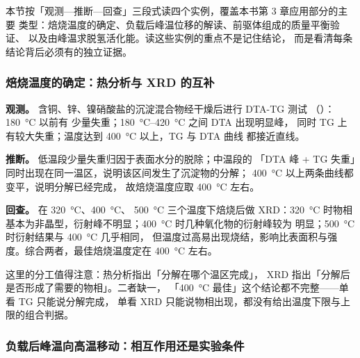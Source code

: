 \begin{probout}
本节按「观测—推断—回查」三段式读四个实例，覆盖本书第 3 章应用部分的主要
类型：焙烧温度的确定、负载后峰温位移的解读、前驱体组成的质量平衡验证、
以及由峰温求脱氢活化能。读这些实例的重点不是记住结论，
而是看清每条结论背后必须有的独立证据。
\end{probout}

\subsubsection{焙烧温度的确定：热分析与 XRD 的互补}

\begin{dataflow}
\textbf{观测。} 含铜、锌、镍硝酸盐的沉淀混合物经干燥后进行 DTA-TG 测试
（）：\qty{180}{\celsius} 以前有
少量失重；\qty{180}{\celsius}--\qty{420}{\celsius} 之间 DTA 出现明显峰，
同时 TG 上有较大失重；温度达到 \qty{400}{\celsius} 以上，TG 与 DTA 曲线
都接近直线。

\textbf{推断。} 低温段少量失重归因于表面水分的脱除；中温段的
「DTA 峰 + TG 失重」同时出现在同一温区，说明该区间发生了沉淀物的分解；
\qty{400}{\celsius} 以上两条曲线都变平，说明分解已经完成，
故焙烧温度应取 \qty{400}{\celsius} 左右。

\textbf{回查。} 在 \qty{320}{\celsius}、\qty{400}{\celsius}、
\qty{500}{\celsius} 三个温度下焙烧后做 XRD：\qty{320}{\celsius} 时物相
基本为非晶型，衍射峰不明显；\qty{400}{\celsius} 时几种氧化物的衍射峰较为
明显；\qty{500}{\celsius} 时衍射结果与 \qty{400}{\celsius} 几乎相同，
但温度过高易出现烧结，影响比表面积与强度。综合两者，最佳焙烧温度定在
\qty{400}{\celsius} 左右。

这里的分工值得注意：热分析指出「分解在哪个温区完成」，
XRD 指出「分解后是否形成了需要的物相」。二者缺一，
「\qty{400}{\celsius} 最佳」这个结论都不完整——单看 TG 只能说分解完成，
单看 XRD 只能说物相出现，都没有给出温度下限与上限的组合判据。
\end{dataflow}

\subsubsection{负载后峰温向高温移动：相互作用还是实验条件}

